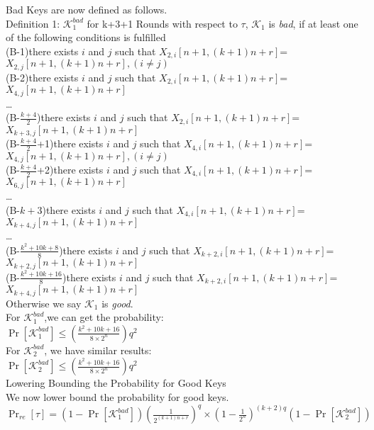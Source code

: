Bad Keys are now defined as follows.\\
Definition 1: $\mathcal{K}_{1}^{bad}$  for k+3+1 Rounds
with respect to $\tau$, $\mathcal{K}_{1}$  is {\it bad}, if at least one of the following conditions is fulfilled\\
(B-1)there exists $i$ and $j$ such that $X_{2,i}[n+1,(k+1)n+r]$=$X_{2,j}[n+1,(k+1)n+r],(i\neq j)$\\
(B-2)there exists $i$ and $j$ such that $X_{2,i}[n+1,(k+1)n+r]$=$X_{4,j}[n+1,(k+1)n+r]$\\
\dots\\
(B-$\frac{k+4}{2}$)there exists $i$ and $j$ such that $X_{2,i}[n+1,(k+1)n+r]$=$X_{k+3,j}[n+1,(k+1)n+r]$\\
(B-$\frac{k+4}{2}$+1)there exists $i$ and $j$ such that $X_{4,i}[n+1,(k+1)n+r]$=$X_{4,j}[n+1,(k+1)n+r],(i\neq j)$\\
(B-$\frac{k+4}{2}$+2)there exists $i$ and $j$ such that $X_{4,i}[n+1,(k+1)n+r]$=$X_{6,j}[n+1,(k+1)n+r]$\\
\dots \\
(B-$k+3$)there exists $i$ and $j$ such that $X_{4,i}[n+1,(k+1)n+r]$=$X_{k+4,j}[n+1,(k+1)n+r]$\\
\dots \\
(B-$\frac{k^{2}+10k+8}{8}$)there exists $i$ and $j$ such that $X_{k+2,i}[n+1,(k+1)n+r]$=$X_{k+2,j}[n+1,(k+1)n+r]$\\
(B-$\frac{k^{2}+10k+16}{8}$)there exists $i$ and $j$ such that $X_{k+2,i}[n+1,(k+1)n+r]$=$X_{k+4,j}[n+1,(k+1)n+r]$\\
Otherwise we say $\mathcal{K}_{1}$ is {\it good}.\\

For $\mathcal{K}_{1}^{bad}$,we can get the probability:\\
$\Pr[\mathcal{K}_{1}^{bad}]\leq (\frac{k^{2}+10k+16}{8\times2^{n}})q^{2}$\\

For $\mathcal{K}_{2}^{bad}$, we have similar results:\\
$\Pr[\mathcal{K}_{2}^{bad}]\leq (\frac{k^{2}+10k+16}{8\times2^{n}})q^{2}$\\

Lowering Bounding the Probability for Good Keys\\
We now lower bound the probability for good keys.\\
$\Pr_{re}[\tau]=(1-\Pr[\mathcal{K}_{1}^{bad}])(\frac{1}{2^{(k+1)n+r}})^{q}\times(1-\frac{1}{2^{n}})^{(k+2)q}
(1-\Pr[\mathcal{K}_{2}^{bad}])$

